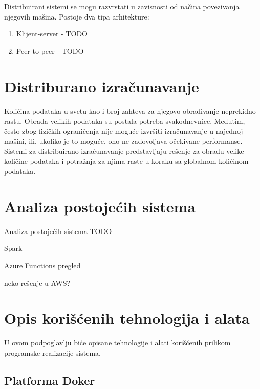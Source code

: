 \documentclass[12pt,oneside]{memoir}
\begin{document}
Distribuirani sistemi se mogu razvrstati u zavisnosti od načina povezivanja njegovih mašina. Postoje dva tipa arhitekture:
\begin{enumerate}
\item Klijent-server - TODO
\item Peer-to-peer - TODO
\end{enumerate}



\section{Distriburano izračunavanje}

Količina podataka u svetu kao i broj zahteva za njegovo obrađivanje neprekidno rastu. Obrada velikih podataka su postala potreba svakodnevnice. Međutim, često zbog fizičkih ograničenja nije moguće izvršiti izračunavanje u najednoj mašini, ili, ukoliko je to moguće, ono ne zadovoljava očekivane performanse. Sistemi za distribuirano izračunavanje predstavljaju rešenje za obradu velike količine podataka i potražnja za njima raste u koraku sa globalnom količinom podataka.

\section{Analiza postojećih sistema}
\label{sec:postojeca_resenja}

Analiza postojećih sistema TODO

Spark \cite{Spark}

Azure Functions pregled

neko rešenje u AWS?

\section{Opis korišćenih tehnologija i alata}

U ovom podpoglavlju biće opisane tehnologije i alati korišćenih prilikom programske realizacije sistema.

\subsection{Platforma Doker}
\label{subs:docker_platform}
\end{document}
